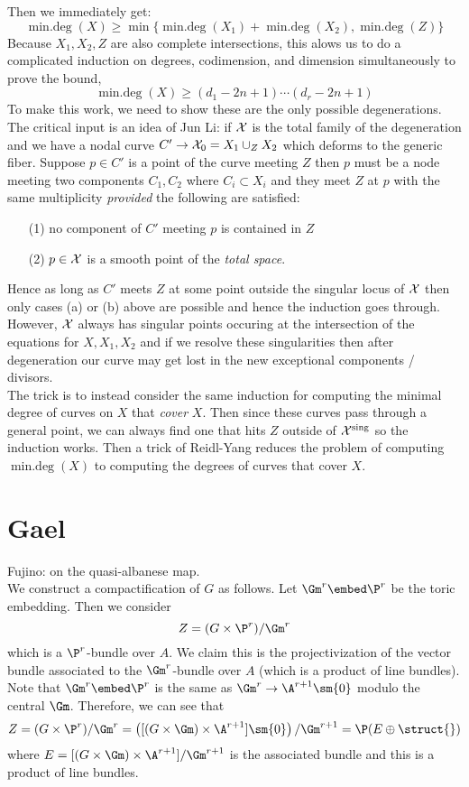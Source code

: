 \documentclass[12pt]{article}
\theoremstyle{plain}
\DeclareMathOperator{\mindeg}{min.deg}
\begin{document}
Then we immediately get: 
\[ \mindeg(X) \ge \min \{ \mindeg(X_1) + \mindeg(X_2), \mindeg(Z) \} \]
Because $X_1, X_2, Z$ are also complete intersections, this alows us to do a complicated induction on degrees, codimension, and dimension simultaneously to prove the bound,
\[ \mindeg(X) \ge (d_1 - 2n + 1) \cdots (d_r - 2n + 1) \]
{\color{red}
To make this work, we need to show these are the only possible degenerations. The critical input is an idea of Jun Li:} if $\mathcal{X}$ is the total family of the degeneration and we have a nodal curve $C' \to \mathcal{X}_0 = X_1 \cup_Z X_2$ which deforms to the generic fiber. Suppose $p \in C'$ is a point of the curve meeting $Z$ then $p$ must be a node meeting two components $C_1, C_2$ where $C_i \subset X_i$ and they meet $Z$ at $p$ with the same multiplicity \textit{provided} the following are satisfied:
\begin{enumerate}
\item[(1)] no component of $C'$ meeting $p$ is contained in $Z$
\item[(2)] $p \in \mathcal{X}$ is a smooth point of the \textit{total space}.
\end{enumerate}

{\color{red} Hence as long as $C'$ meets $Z$ at some point outside the singular locus of $\mathcal{X}$ then only cases (a) or (b) above are possible and hence the induction goes through.} However, $\mathcal{X}$ always has singular points occuring at the intersection of the equations for $X, X_1, X_2$ {\color{red} and if we resolve these singularities then after degeneration our curve may get lost in the new exceptional components / divisors.}
\bigskip\\
{\color{red} The trick is to instead consider the same induction for computing the minimal degree of curves on $X$ that \textit{cover} $X$. Then since these curves pass through a general point, we can always find one that hits $Z$ outside of $\mathcal{X}^{\text{sing}}$ so the induction works. Then a trick of Reidl-Yang reduces the problem of computing $\mindeg(X)$ to computing the degrees of curves that cover $X$.}

\newpage

\section{Gael}

\newcommand{\alb}{\mathrm{alb}}

Fujino: on the quasi-albanese map.
\bigskip\\
We construct a compactification of $G$ as follows. Let $\Gm^r \embed \P^r$ be the toric embedding. Then we consider 
\[ Z = (G \times \P^r) / \Gm^r \]
which is a $\P^r$-bundle over $A$. We claim this is the projectivization of the vector bundle associated to the $\Gm^r$-bundle over $A$ (which is a product of line bundles). Note that $\Gm^r \embed \P^r$ is the same as $\Gm^r \to \A^{r+1} \sm \{ 0 \}$ modulo the central $\Gm$. Therefore, we can see that 
\[ Z = (G \times \P^r) / \Gm^r = \left( [(G \times \Gm) \times \A^{r + 1}] \sm \{ 0 \} \right) / \Gm^{r + 1} = \P(E \oplus \struct{}) \]
where $E = [(G \times \Gm) \times \A^{r+1}]/\Gm^{r+1}$ is the associated bundle and this is a product of line bundles.  
\end{document}

